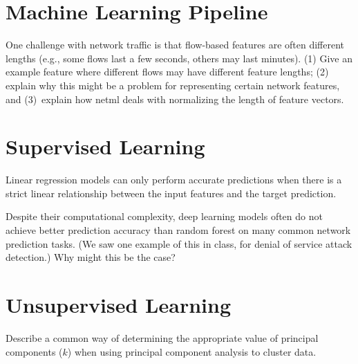 \section*{Machine Learning Pipeline}

 One challenge with network traffic is that flow-based features are
often different lengths (e.g., some flows last a few seconds, others may last
minutes).  (1) Give an example feature where different flows may have
different feature lengths; (2) explain why this might be a problem for
representing certain network features, and (3)~explain how netml deals with
normalizing the length of feature vectors.

\eprob

\section*{Supervised Learning}

Linear regression models can only perform accurate predictions when there is a
strict linear relationship between the input features and the target
prediction.
\framebox{
\yesnono
}
\eprob

Despite their computational complexity, deep learning models often do not achieve better
prediction accuracy than random forest on many common network prediction
tasks. (We saw one example of this in class, for denial of service attack
detection.) Why might this be the case?

\eprob


\section*{Unsupervised Learning}

 Describe a common way of determining
the appropriate value of principal components ($k$) when using principal component analysis to
cluster data.

